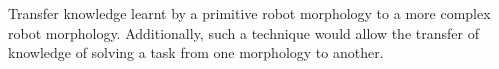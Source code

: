 Transfer knowledge learnt by a primitive robot morphology to a more complex robot morphology.
Additionally, such a technique would allow the transfer of knowledge of solving a task from one morphology to another.
